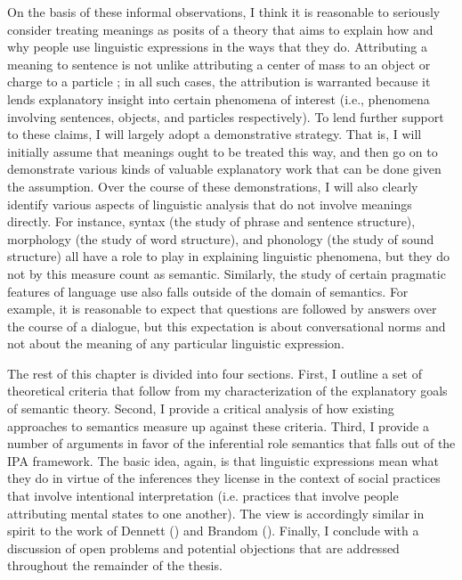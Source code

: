 On the basis of these informal observations, I think it is reasonable to seriously consider treating meanings as posits of a theory that aims to explain how and why people use linguistic expressions in the ways that they do. Attributing a meaning to sentence is not unlike attributing a center of mass to an object or charge to a particle \citep[see][]{Dennett:1987}; in all such cases, the attribution is warranted because it lends explanatory insight into certain phenomena of interest (i.e., phenomena involving sentences, objects, and particles respectively). To lend further support to these claims, I will largely adopt a demonstrative strategy. That is, I will initially assume that meanings ought to be treated this way, and then go on to demonstrate various kinds of valuable explanatory work that can be done given the assumption. Over the course of these demonstrations, I will also clearly identify various aspects of linguistic analysis that do not involve meanings directly. For instance, syntax (the study of phrase and sentence structure), morphology (the study of word structure), and phonology (the study of sound structure) all have a role to play in explaining linguistic phenomena, but they do not by this measure count as semantic. Similarly, the study of certain pragmatic features of language use also falls outside of the domain of semantics. For example, it is reasonable to expect that questions are followed by answers over the course of a dialogue, but this expectation is about conversational norms and not about the meaning of any particular linguistic expression.

The rest of this chapter is divided into four sections. First, I outline a set of theoretical criteria that follow from my characterization of the explanatory goals of semantic theory. Second, I provide a critical analysis of how existing approaches to semantics measure up against these criteria. Third, I provide a number of arguments in favor of the inferential role semantics that falls out of the IPA framework. The basic idea, again, is that linguistic expressions mean what they do in virtue of the inferences they license in the context of social practices that involve intentional interpretation (i.e. practices that involve people attributing mental states to one another). The view is accordingly similar in spirit to the work of Dennett (\citeyear{Dennett:1987,Dennett:1991}) and Brandom (\citeyear{Brandom:1994,Brandom:2009,Brandom:2000}). Finally, I conclude with a discussion of open problems and potential objections that are addressed throughout the remainder of the thesis. 

